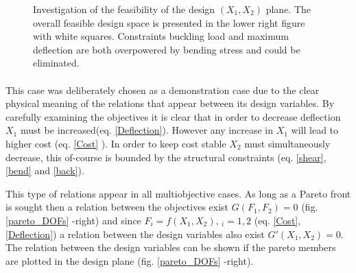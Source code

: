 \begin{figure}[h!]
\caption{Investigation of the feasibility of the design $(X_1,X_2)$ plane. The overall feasible design space is presented in the lower right figure with white squares. Constraints buckling load and maximum deflection  are both overpowered by bending stress and could be eliminated.} 
\label{x1x2}
\end{figure}


\paragraph{}
This case was deliberately chosen as a demonstration case due to the clear physical meaning of the relations that appear between its design variables. By carefully examining the objectives it is clear that in order to decrease deflection $X_1$ must be increased(eq. \ref{Deflection}). However any increase in $X_1$ will lead to higher cost (eq. \ref{Cost} ). In order to keep cost stable $X_2$ must simultaneously decrease, this of-course is bounded by the structural constraints (eq. \ref{shear},\ref{bend} and \ref{back}). 
 
This type of relations appear in all multiobjective cases. As long as a Pareto front is sought then a relation between the objectives exist $G(F_1,F_2)=0$ (fig. \ref{pareto_DOFs} -right) and since $F_i=f(X_1,X_2)$, $_i=1,2$ (eq. \ref{Cost},\ref{Deflection}) a relation between the design variables also exist $G'(X_1,X_2)=0$. The relation between the design variables can be shown if the pareto members are plotted in the design plane (fig. \ref{pareto_DOFs} -right).

